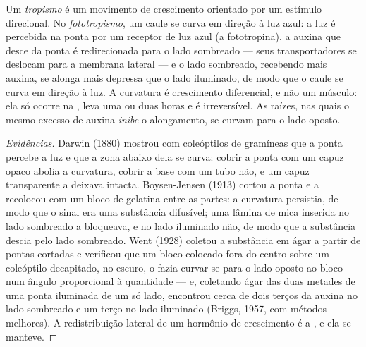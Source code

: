 \begin{proposition}[Fototropismo]\label{prop:b2:plant-plasticity:phototropism}
Um \emph{tropismo} é um movimento de crescimento orientado por um
estímulo direcional. No \emph{fototropismo}, um caule se curva em
direção à luz azul: a luz é percebida na ponta por um receptor de luz
azul (a fototropina), a auxina que desce da ponta é redirecionada para
o lado sombreado --- seus transportadores se deslocam para a membrana
lateral --- e o lado sombreado, recebendo mais auxina, se alonga mais
depressa que o lado iluminado, de modo que o caule se curva em direção
à luz. A curvatura é crescimento diferencial, e não um músculo: ela só
ocorre na , leva uma ou duas horas e é
irreversível. As raízes, nas quais o mesmo excesso de auxina
\emph{inibe} o alongamento, se curvam para o lado oposto.
\end{proposition}
\begin{proof}[Evidências]
Darwin (1880) mostrou com coleóptilos de gramíneas que a ponta percebe
a luz e que a zona abaixo dela se curva: cobrir a ponta com um capuz
opaco abolia a curvatura, cobrir a base com um tubo não, e um capuz
transparente a deixava intacta. Boysen-Jensen (1913) cortou a ponta e a
recolocou com um bloco de gelatina entre as partes: a curvatura
persistia, de modo que o sinal era uma substância difusível; uma lâmina
de mica inserida no lado sombreado a bloqueava, e no lado iluminado
não, de modo que a substância descia pelo lado sombreado. Went (1928)
coletou a substância em ágar a partir de pontas cortadas e verificou
que um bloco colocado fora do centro sobre um coleóptilo decapitado, no
escuro, o fazia curvar-se para o lado oposto ao bloco --- num ângulo
proporcional à quantidade --- e, coletando ágar das duas metades de uma
ponta iluminada de um só lado, encontrou cerca de dois terços da
auxina no lado sombreado e um terço no lado iluminado (Briggs, 1957,
com métodos melhores). A redistribuição lateral de um hormônio de
crescimento é a , e ela se manteve.
\end{proof}

